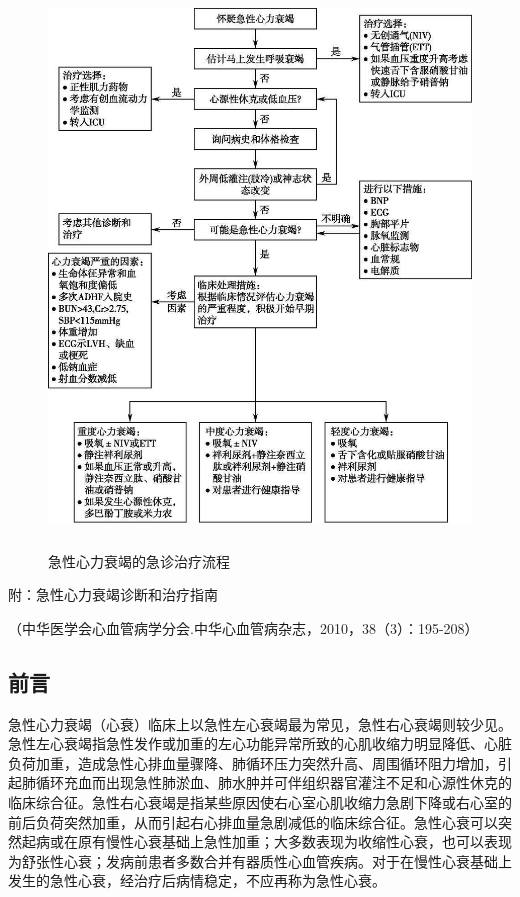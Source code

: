 \begin{figure}[!htbp]
 \centering
 \includegraphics[width=4.83333in,height=5.86458in]{./images/Image00097.jpg}
 \captionsetup{justification=centering}
 \caption{急性心力衰竭的急诊治疗流程}
 \label{fig26-1}
  \end{figure} 

\protect\hypertarget{text00071.html}{}{}

\hypertarget{text00071.htmlux5cux23CHP3-2-5}{}
附：急性心力衰竭诊断和治疗指南

（中华医学会心血管病学分会.中华心血管病杂志，2010，38（3）：195-208）

\subsection{前言}

急性心力衰竭（心衰）临床上以急性左心衰竭最为常见，急性右心衰竭则较少见。急性左心衰竭指急性发作或加重的左心功能异常所致的心肌收缩力明显降低、心脏负荷加重，造成急性心排血量骤降、肺循环压力突然升高、周围循环阻力增加，引起肺循环充血而出现急性肺淤血、肺水肿并可伴组织器官灌注不足和心源性休克的临床综合征。急性右心衰竭是指某些原因使右心室心肌收缩力急剧下降或右心室的前后负荷突然加重，从而引起右心排血量急剧减低的临床综合征。急性心衰可以突然起病或在原有慢性心衰基础上急性加重；大多数表现为收缩性心衰，也可以表现为舒张性心衰；发病前患者多数合并有器质性心血管疾病。对于在慢性心衰基础上发生的急性心衰，经治疗后病情稳定，不应再称为急性心衰。

